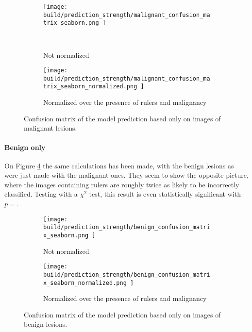 \begin{figure}[h]
    \centering
    \begin{subfigure}[h]{0.45\textwidth}
        \texttt{[image: 
            build/prediction\_strength/malignant\_confusion\_matrix\_seaborn.png
        ]}
        \caption{Not normalized}
        \label{fig:prediction_strength_ruler_malignant_not_normalized}\
    \end{subfigure}
    \begin{subfigure}[h]{0.45\textwidth}
        \texttt{[image: 
            build/prediction\_strength/malignant\_confusion\_matrix\_seaborn\_normalized.png
        ]}
        \caption{Normalized over the presence of rulers and malignancy}
        \label{fig:prediction_strength_ruler_normalized_malignant}
    \end{subfigure}
    \caption{Confusion matrix of the model prediction based only on images of malignant lesions.}
    \label{fig:prediction_strength_ruler_malignant}
\end{figure}



\paragraph{Benign only}
On Figure \ref{fig:prediction_strength_ruler_benign} the same calculations has been made,
with the benign lesions as were just made with the malignant ones.
They seem to show the opposite picture, where the images containing rulers are roughly
twice as likely to be incorrectly classified.
Testing with a $\chi^2$ test, this result is even statistically significant with
$p=$.

\begin{figure}[h]
    \centering
    \begin{subfigure}[h]{0.45\textwidth}
        \texttt{[image: 
            build/prediction\_strength/benign\_confusion\_matrix\_seaborn.png
        ]}
        \caption{Not normalized}
        \label{fig:prediction_strength_ruler_benign}
    \end{subfigure}
    \begin{subfigure}[h]{0.45\textwidth}
        \texttt{[image: 
            build/prediction\_strength/benign\_confusion\_matrix\_seaborn\_normalized.png
        ]}
        \caption{Normalized over the presence of rulers and malignancy}
        \label{fig:prediction_strength_ruler_normalized_benign}
    \end{subfigure}
    \caption{Confusion matrix of the model prediction based only on images of benign lesions.}
\end{figure}

